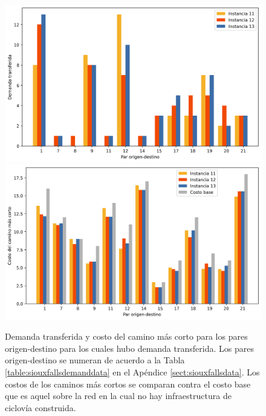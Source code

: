 \begin{figure}[h!]
  \centering
  \includegraphics[width=12cm]{../resources/sensibility_case_study_demand.png}
  \includegraphics[width=12cm]{../resources/sensibility_case_study_shortest_paths.png}
  \caption{Demanda transferida y costo del camino más corto para los pares origen-destino para los cuales hubo demanda transferida. Los pares origen-destino se numeran de acuerdo a la Tabla \ref{table:siouxfallsdemanddata} en el Apéndice \ref{sect:siouxfallsdata}. Los costos de los caminos más cortos se comparan contra el costo base que es aquel sobre la red en la cual no hay infraestructura de ciclovía construida.}
  \label{fig:sensibilitybyodpair_11_12_13}
\end{figure}

